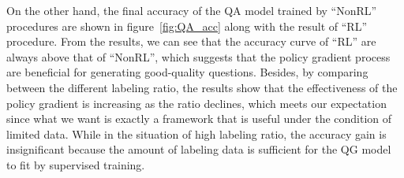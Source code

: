 \documentclass{article}
\begin{document}
On the other hand, the final accuracy of the QA model trained by ``NonRL'' procedures are shown in figure~\ref{fig:QA_acc} along with the result of ``RL'' procedure. From the results, we can see that the accuracy curve of ``RL'' are always above that of ``NonRL'', which suggests that the policy gradient process are beneficial for generating good-quality questions. Besides, by comparing between the different labeling ratio, the results show that the effectiveness of the policy gradient is increasing as the ratio declines, which meets our expectation since what we want is exactly a framework that is useful under the condition of limited data. While in the situation of high labeling ratio, the accuracy gain is insignificant because the amount of labeling data is sufficient for the QG model to fit by supervised training.
\end{document}
